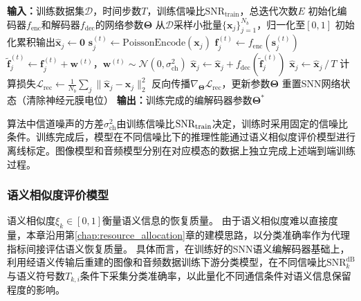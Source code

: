 \begin{algorithm}[!ht]
\caption{SNN语义编解码器端到端训练}
\label{sec4:alg_snn_train}
\begin{algorithmic}[1]
\STATE \textbf{输入：}训练数据集$\mathcal{D}$，时间步数$T$，训练信噪比$\text{SNR}_{\text{train}}$，总迭代次数$E$
\STATE 初始化编码器$f_{\text{enc}}$和解码器$f_{\text{dec}}$的网络参数$\boldsymbol{\Theta}$
    \STATE 从$\mathcal{D}$采样小批量$\{\mathbf{x}_j\}_{j=1}^{N_b}$，归一化至$[0,1]$
    \STATE 初始化累积输出$\hat{\mathbf{x}}_j \leftarrow \mathbf{0}$
        \STATE $\mathbf{s}_j^{(t)} \leftarrow \text{PoissonEncode}(\mathbf{x}_j)$ 
        \STATE $\mathbf{f}_j^{(t)} \leftarrow f_{\text{enc}}(\mathbf{s}_j^{(t)})$ 
        \STATE $\tilde{\mathbf{f}}_j^{(t)} \leftarrow \mathbf{f}_j^{(t)} + \mathbf{w}^{(t)}$，$\mathbf{w}^{(t)} \sim \mathcal{N}(0, \sigma_{\text{ch}}^2)$ 
        \STATE $\hat{\mathbf{x}}_j \leftarrow \hat{\mathbf{x}}_j + f_{\text{dec}}(\tilde{\mathbf{f}}_j^{(t)})$
    \ENDFOR
    \STATE $\hat{\mathbf{x}}_j \leftarrow \hat{\mathbf{x}}_j \,/\, T$ 
    \STATE 计算损失$\mathcal{L}_{\text{rec}} \leftarrow \frac{1}{N_b}\sum_j\|\hat{\mathbf{x}}_j - \mathbf{x}_j\|_2^2$
    \STATE 反向传播$\nabla_{\boldsymbol{\Theta}}\mathcal{L}_{\text{rec}}$，更新参数$\boldsymbol{\Theta}$
    \STATE 重置SNN网络状态（清除神经元膜电位） 
\ENDFOR
\STATE \textbf{输出：}训练完成的编解码器参数$\boldsymbol{\Theta}^*$
\end{algorithmic}
\end{algorithm}

算法中信道噪声的方差$\sigma_{\text{ch}}^2$由训练信噪比$\text{SNR}_{\rm train}$决定，训练时采用固定的信噪比条件。训练完成后，模型在不同信噪比下的推理性能通过语义相似度评价模型进行离线标定。图像模型和音频模型分别在对应模态的数据上独立完成上述端到端训练过程。


\subsubsection{语义相似度评价模型}
语义相似度$\xi_k \in [0,1]$衡量语义信息的恢复质量。
由于语义相似度难以直接度量，本章沿用第\ref{chap:resource_allocation}章的建模思路\supercite{Hu_2025_TCOM_Resource}，以分类准确率作为代理指标间接评估语义恢复质量。
具体而言，在训练好的SNN语义编解码器基础上，利用经语义传输后重建的图像和音频数据训练下游分类模型，在不同信噪比$\text{SNR}_k^{\text{dB}}$与语义符号数$T_{k,i}$条件下采集分类准确率，以此量化不同通信条件对语义信息保留程度的影响。

